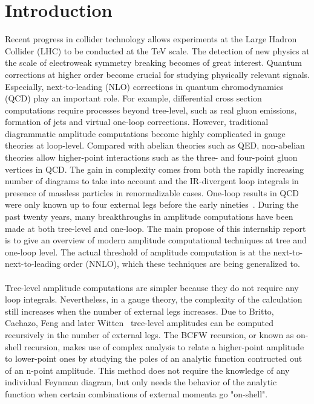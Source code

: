 \section{Introduction}
Recent progress in collider technology allows experiments at the Large Hadron Collider (LHC) to be conducted at the TeV scale.
The detection of new physics at the scale of electroweak symmetry breaking becomes of great interest. 
Quantum corrections at higher order become crucial for studying physically relevant signals. 
Especially, next-to-leading (NLO) corrections in quantum chromodynamics (QCD) play an important role. 
For example, differential cross section computations require processes beyond tree-level, such as real gluon emissions, formation of jets and virtual one-loop corrections.
However, traditional diagrammatic amplitude computations become highly complicated in gauge theories at loop-level.
Compared with abelian theories such as QED, non-abelian theories allow higher-point interactions such as the three- and four-point gluon vertices in QCD.
The gain in complexity comes from both the rapidly increasing number of diagrams to take into account and the IR-divergent loop integrals in presence of massless particles in renormalizable cases.  
One-loop results in QCD were only known up to four external legs before the early nineties~\cite{Bern:1994zx}. 
During the past twenty years, many breakthroughs in amplitude computations have been made at both tree-level and one-loop.
The main propose of this internship report is to give an overview of modern amplitude computational techniques at tree and one-loop level.
The actual threshold of amplitude computation is at the next-to-next-to-leading order (NNLO), which these techniques are being generalized to.
\\\\
Tree-level amplitude computations are simpler because they do not require any loop integrals.
Nevertheless, in a gauge theory, the complexity of the calculation still increases when the number of external legs increases.
Due to Britto, Cachazo, Feng and later Witten~\cite{BRITTO2005499, PhysRevLett.94.181602}
tree-level amplitudes can be computed recursively in the number of external legs.
The BCFW recursion, or known as on-shell recursion, makes use of complex analysis to relate a higher-point amplitude to lower-point ones by studying the poles of an analytic function contructed out of an n-point amplitude.
This method does not require the knowledge of any individual Feynman diagram, but only needs the behavior of the analytic function when certain combinations of external momenta go "on-shell". 

